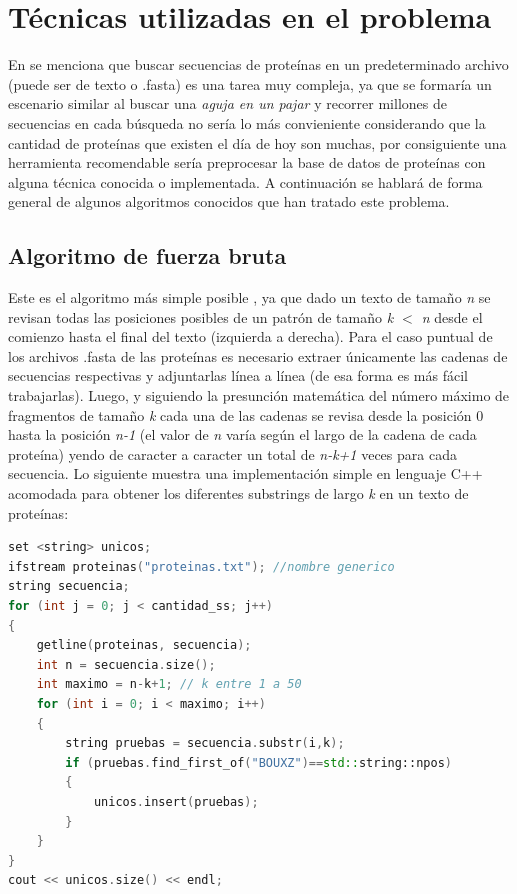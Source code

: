 \section{Técnicas utilizadas en el problema}

En \cite{searching} se menciona que buscar secuencias de proteínas en un predeterminado archivo (puede ser de texto o .fasta) es una tarea muy compleja, ya que se formaría un escenario similar al buscar una {\textit{aguja en un pajar}} y recorrer millones de secuencias en cada búsqueda no sería lo más convieniente considerando que la cantidad de proteínas que existen el día de hoy son muchas, por consiguiente una herramienta recomendable sería preprocesar la base de datos de proteínas con alguna técnica conocida o implementada. A continuación se hablará de forma general de algunos algoritmos conocidos que han tratado este problema.

\subsection{Algoritmo de fuerza bruta}

Este es el algoritmo más simple posible \cite{fuerzabruta}, ya que dado un texto de tamaño \textit{n} se revisan todas las posiciones posibles de un patrón de tamaño \textit{k $<$ n} desde el comienzo hasta el final del texto (izquierda a derecha). Para el caso puntual de los archivos .fasta de las proteínas es necesario extraer únicamente las cadenas de secuencias respectivas y adjuntarlas línea a línea (de esa forma es más fácil trabajarlas). Luego, y siguiendo la presunción matemática del número máximo de fragmentos de tamaño \textit{k} cada una de las cadenas se revisa desde la posición 0 hasta la posición \textit{n-1} (el valor de \textit{n} varía según el largo de la cadena de cada proteína) yendo de caracter a caracter un total de \textit{n-k+1} veces para cada secuencia. Lo siguiente muestra una implementación simple en lenguaje C++ acomodada para obtener los diferentes substrings de largo \textit{k} en un texto de proteínas:
\\
\begin{lstlisting}[language=C++, caption=Búsqueda utilizando fuerza bruta en C++]
set <string> unicos;
ifstream proteinas("proteinas.txt"); //nombre generico
string secuencia;
for (int j = 0; j < cantidad_ss; j++)
{
    getline(proteinas, secuencia);
    int n = secuencia.size();
    int maximo = n-k+1; // k entre 1 a 50
    for (int i = 0; i < maximo; i++)
    {
        string pruebas = secuencia.substr(i,k);
        if (pruebas.find_first_of("BOUXZ")==std::string::npos)
        {
            unicos.insert(pruebas);
        }
    }
}
cout << unicos.size() << endl;
\end{lstlisting}

